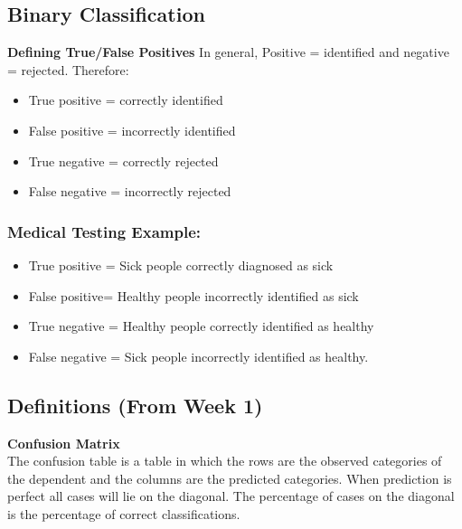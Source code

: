 \documentclass[]{report}
\begin{document}




\subsection{Binary Classification}
\noindent \textbf{Defining True/False Positives}
In general, Positive = identified and negative = rejected. Therefore:

\begin{itemize}
	\item True positive = correctly identified
	
	\item False positive = incorrectly identified
	
	\item True negative = correctly rejected
	
	\item False negative = incorrectly rejected
\end{itemize}
\subsubsection*{Medical Testing Example:}
\begin{itemize}
	\item True positive = Sick people correctly diagnosed as sick
	
	\item False positive= Healthy people incorrectly identified as sick
	
	\item True negative = Healthy people correctly identified as healthy
	
	\item False negative = Sick people incorrectly identified as healthy.
\end{itemize}
\newpage
\subsection{Definitions (From Week 1)}
\textbf{Confusion Matrix} \\
The confusion
table is a table in which the rows are the observed categories of the dependent and
the columns are the predicted categories. When prediction is perfect all cases will lie on the
diagonal. The percentage of cases on the diagonal is the percentage of correct classifications. 
\end{document}
